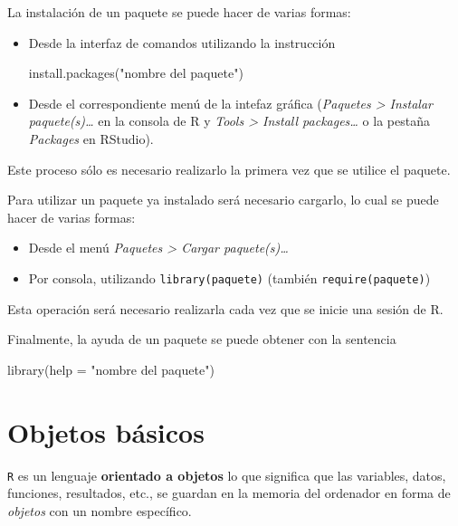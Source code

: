 \documentclass[
]{book}
\newenvironment{Shaded}{\begin{snugshade}}{\end{snugshade}}
\newcommand{\AttributeTok}[1]{\textcolor[rgb]{0.77,0.63,0.00}{#1}}
\newcommand{\FunctionTok}[1]{\textcolor[rgb]{0.00,0.00,0.00}{#1}}
\newcommand{\NormalTok}[1]{#1}
\newcommand{\StringTok}[1]{\textcolor[rgb]{0.31,0.60,0.02}{#1}}
\theoremstyle{break}
\theoremstyle{nonumberplain}
\begin{document}
La instalación de un paquete se puede hacer de varias formas:

\begin{itemize}
\item
  Desde la interfaz de comandos utilizando la instrucción

\begin{Shaded}
\begin{Highlighting}[]
\FunctionTok{install.packages}\NormalTok{(}\StringTok{"nombre del paquete"}\NormalTok{)}
\end{Highlighting}
\end{Shaded}
\item
  Desde el correspondiente menú de la intefaz gráfica (\emph{Paquetes \textgreater{} Instalar paquete(s)\ldots{}} en la consola de R y \emph{Tools \textgreater{} Install packages\ldots{}} o la pestaña \emph{Packages} en RStudio).
\end{itemize}

Este proceso sólo es necesario realizarlo la primera vez que se utilice el paquete.

Para utilizar un paquete ya instalado será necesario cargarlo, lo cual se puede hacer de varias formas:

\begin{itemize}
\item
  Desde el menú \emph{Paquetes \textgreater{} Cargar paquete(s)\ldots{}}
\item
  Por consola, utilizando \texttt{library(paquete)} (también \texttt{require(paquete)})
\end{itemize}

Esta operación será necesario realizarla cada vez que se inicie una
sesión de R.

Finalmente, la ayuda de un paquete se puede obtener con la sentencia

\begin{Shaded}
\begin{Highlighting}[]
\FunctionTok{library}\NormalTok{(}\AttributeTok{help =} \StringTok{"nombre del paquete"}\NormalTok{) }
\end{Highlighting}
\end{Shaded}

\hypertarget{objetos-buxe1sicos}{%
\section{Objetos básicos}\label{objetos-buxe1sicos}}

\texttt{R} es un lenguaje \textbf{orientado a objetos} lo que significa que las variables, datos, funciones, resultados, etc., se guardan en la memoria del ordenador en forma de \emph{objetos} con un nombre específico.
\end{document}
